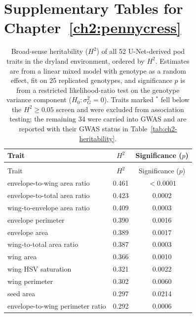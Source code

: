 \chapter{Supplementary Tables for Chapter~\ref{ch2:pennycress}}

\begingroup
\small
\setlength{\tabcolsep}{6pt}
\renewcommand{\arraystretch}{1.05}
\begin{longtable}{@{}>{\raggedright\arraybackslash}p{} c c@{}}
    \caption[Broad-sense heritability ($H^2$) of all 52 U-Net-derived pod traits in the dryland environment]{Broad-sense heritability ($H^2$) of all 52 U-Net-derived pod traits in the dryland environment, ordered by $H^2$. Estimates are from a linear mixed model with genotype as a random effect, fit on 25 replicated genotypes, and significance $p$ is from a restricted likelihood-ratio test on the genotype variance component ($H_0\!:\sigma^2_G = 0$). Traits marked $^{\ast}$ fell below the $H^2 \geq 0.05$ screen and were excluded from association testing; the remaining 34 were carried into GWAS and are reported with their GWAS status in Table~\ref{tab:ch2-heritability}.}\label{tbl:heritability-all}\\
    \toprule
    Trait & $H^2$ & Significance ($p$) \\
    \midrule
    \endfirsthead
    \multicolumn{3}{c}{\tablename\ \thetable\ (continued)}\\
    \toprule
    Trait & $H^2$ & Significance ($p$) \\
    \midrule
    \endhead
    \midrule
    \endfoot
    \bottomrule
    \endlastfoot
        envelope-to-wing area ratio & 0.461 & $<0.0001$ \\
        envelope-to-total area ratio & 0.423 & 0.0002 \\
        wing-to-envelope area ratio & 0.409 & 0.0003 \\
        envelope perimeter & 0.390 & 0.0016 \\
        envelope area & 0.389 & 0.0017 \\
        wing-to-total area ratio & 0.387 & 0.0003 \\
        wing area & 0.366 & 0.0010 \\
        wing HSV saturation & 0.321 & 0.0022 \\
        wing perimeter & 0.302 & 0.0060 \\
        seed area & 0.297 & 0.0214 \\
        envelope-to-wing perimeter ratio & 0.292 & 0.0006 \\

\end{longtable}
